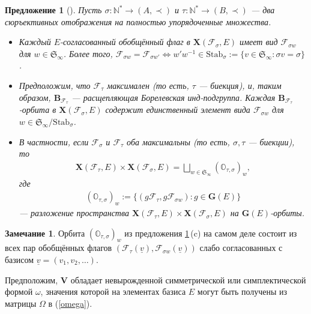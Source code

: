 \documentclass{amsart}
\newtheorem{proposition}{Предложение}
\theoremstyle{definition}
\newtheorem{remark}{Замечание}
\newcommand{\NN}{\mathbb{N}^*}
\begin{document}
\begin{proposition}[\cite{Fresse-Penkov}]
\label{P2-3.2}
Пусть $\sigma:\NN\to (A,\prec)$ и $\tau:\NN\to (B,\prec)$ --- два сюръективных отображения  на полностью упорядоченные множества.
\begin{itemize}
\item[\rm (a)] Каждый $E$-согласованный обобщённый флаг в $\mathbf{X}(\mathcal{F}_\sigma,E)$ имеет вид $\mathcal{F}_{\sigma w}$ для $w\in \mathfrak{S}_\infty$.
Более того, $\mathcal{F}_{\sigma w}=\mathcal{F}_{\sigma w'}\Leftrightarrow
w'w^{-1}\in\mathrm{Stab}_\sigma:=\{v\in\mathfrak{S}_\infty:\sigma v=\sigma\}$.
\item[\rm (b)] Предположим, что $\mathcal{F}_\tau$ максимален (то есть, $\tau$ --- биекция), и, таким образом, $\mathbf{B}_{\mathcal{F}_\tau}$ --- расщепляющая Борелевская инд-подгруппа.
Каждая $\mathbf{B}_{\mathcal{F}_\tau}$-орбита  в $\mathbf{X}(\mathcal{F}_\sigma,E)$
содержит единственный элемент вида $\mathcal{F}_{\sigma w}$ для $w\in\mathfrak{S}_\infty/\mathrm{Stab}_\sigma$.
\item[\rm (c)] В частности, если $\mathcal{F}_\sigma$ и $\mathcal{F}_\tau$ оба максимальны (то есть, $\sigma,\tau$ --- биекции), то
\begin{eqnarray*}
\displaystyle \mathbf{X}(\mathcal{F}_\tau,E)\times\mathbf{X}(\mathcal{F}_\sigma,E)=\bigsqcup_{w\in\mathfrak{S}_\infty}(\pmb{\mathbb{O}}_{\tau,\sigma})_w ,
\end{eqnarray*}
где
\begin{eqnarray*}
(\pmb{\mathbb{O}}_{\tau,\sigma})_w:=\{(g\mathcal{F}_\tau,g\mathcal{F}_{\sigma w}):g\in\mathbf{G}(E)\}
\end{eqnarray*}
--- разложение пространства $\mathbf{X}(\mathcal{F}_\tau,E)\times\mathbf{X}(\mathcal{F}_\sigma,E)$ на $\mathbf{G}(E)$-орбиты.
\end{itemize}
\end{proposition}

\begin{remark}
Орбита $(\pmb{\mathbb{O}}_{\tau,\sigma})_w$
из предложения \ref{P2-3.2}\,{\rm (c)}
на самом деле состоит из всех пар обобщённых флагов $(\mathcal{F}_\tau(\underline{v}),\mathcal{F}_{\sigma w}(\underline{v}))$
слабо согласованных с базисом $\underline{v}=(v_1,v_2,\ldots)$.
\end{remark}




Предположим, $\mathbf{V}$ обладает невырожденной  симметрической или симплектической  формой $\omega$, значения которой на  элементах базиса $E$ могут быть получены из матрицы $\Omega$ в (\ref{omega}).
\end{document}
